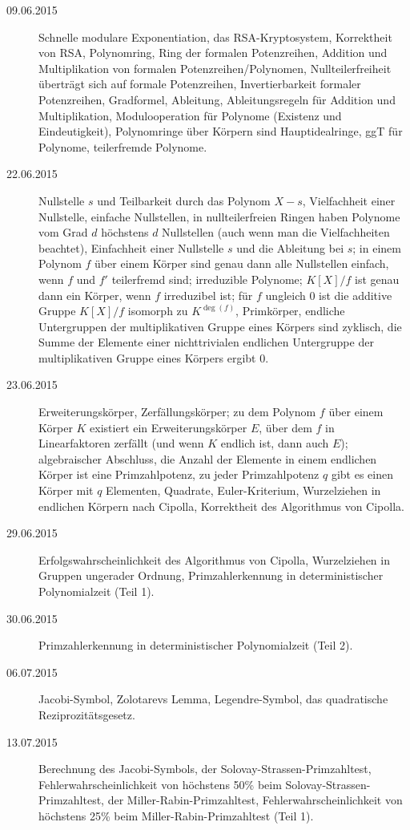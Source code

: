 \documentclass{mywork}
\begin{document}
\begin{description}
    \item[09.06.2015]
        Schnelle modulare Exponentiation, das RSA-Kryptosystem, Korrektheit von RSA, Polynomring, Ring der formalen Potenzreihen, Addition und Multiplikation von formalen Potenzreihen/Polynomen, Nullteilerfreiheit überträgt sich auf formale Potenzreihen, Invertierbarkeit formaler Potenzreihen, Gradformel, Ableitung, Ableitungsregeln für Addition und Multiplikation, Modulooperation für Polynome (Existenz und Eindeutigkeit), Polynomringe über Körpern sind Hauptidealringe, ggT für Polynome, teilerfremde Polynome.
    \item[22.06.2015]
        Nullstelle $s$ und Teilbarkeit durch das Polynom $X-s$, Vielfachheit einer Nullstelle, einfache Nullstellen, in nullteilerfreien Ringen haben Polynome vom Grad $d$ höchstens $d$ Nullstellen (auch wenn man die Vielfachheiten beachtet), Einfachheit einer Nullstelle $s$ und die Ableitung bei $s$; in einem Polynom $f$ über einem Körper sind genau dann alle Nullstellen einfach, wenn $f$ und $f'$ teilerfremd sind; irreduzible Polynome; $K[X]/f$ ist genau dann ein Körper, wenn $f$ irreduzibel ist; für $f$ ungleich 0 ist die additive Gruppe $K[X]/f$ isomorph zu $K^{\deg(f)}$, Primkörper, endliche Untergruppen der multiplikativen Gruppe eines Körpers sind zyklisch, die Summe der Elemente einer nichttrivialen endlichen Untergruppe der multiplikativen Gruppe eines Körpers ergibt 0.
    \item[23.06.2015]
        Erweiterungskörper, Zerfällungskörper; zu dem Polynom $f$ über einem Körper $K$ existiert ein Erweiterungskörper $E$, über dem $f$ in Linearfaktoren zerfällt (und wenn $K$ endlich ist, dann auch $E$); algebraischer Abschluss, die Anzahl der Elemente in einem endlichen Körper ist eine Primzahlpotenz, zu jeder Primzahlpotenz $q$ gibt es einen Körper mit $q$ Elementen, Quadrate, Euler-Kriterium, Wurzelziehen in endlichen Körpern nach Cipolla, Korrektheit des Algorithmus von Cipolla.
    \item[29.06.2015]
        Erfolgswahrscheinlichkeit des Algorithmus von Cipolla, Wurzelziehen in Gruppen ungerader Ordnung, Primzahlerkennung in deterministischer Polynomialzeit (Teil 1).
    \item[30.06.2015]
        Primzahlerkennung in deterministischer Polynomialzeit (Teil 2).
    \item[06.07.2015]
        Jacobi-Symbol, Zolotarevs Lemma, Legendre-Symbol, das quadratische Reziprozitätsgesetz.
    \item[13.07.2015]
        Berechnung des Jacobi-Symbols, der Solovay-Strassen-Primzahltest, Fehlerwahrscheinlichkeit von höchstens 50\% beim Solovay-Strassen-Primzahltest, der Miller-Rabin-Primzahltest, Fehlerwahrscheinlichkeit von höchstens 25\% beim Miller-Rabin-Primzahltest (Teil 1).

\end{description}
\end{document}
